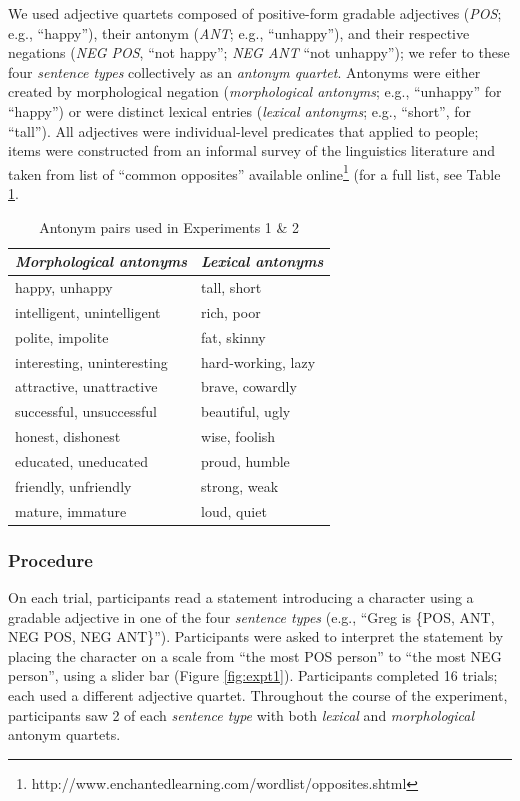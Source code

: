 \documentclass[10pt,letterpaper]{article}
\newcommand{\tableref}[1]{Table \ref{#1}}
\newcommand{\figref}[1]{Figure \ref{#1}}
\begin{document}
We used adjective quartets composed of positive-form gradable adjectives (\emph{POS}; e.g., ``happy''), their antonym (\emph{ANT}; e.g., ``unhappy''), and their respective negations (\emph{NEG POS}, ``not happy''; \emph{NEG ANT} ``not unhappy''); we refer to these four \emph{sentence types} collectively as an \emph{antonym quartet}.
Antonyms were either created by morphological negation (\emph{morphological antonyms}; e.g., ``unhappy'' for ``happy'') or were distinct lexical entries (\emph{lexical antonyms}; e.g., ``short'', for ``tall'').
All adjectives were individual-level predicates that applied to people; items were constructed from an informal survey of the linguistics literature and taken from list of ``common opposites'' available online\footnote{http://www.enchantedlearning.com/wordlist/opposites.shtml} (for a full list, see \tableref{tab:items}.

\begin{table}[b]
\centering
\begin{tabular}{l|l}
\emph{Morphological antonyms}     & \emph{Lexical antonyms}    \\ 
\hline
happy, unhappy             & tall, short         \\
intelligent, unintelligent & rich, poor          \\
polite, impolite           & fat, skinny         \\
interesting, uninteresting & hard-working, lazy  \\
attractive, unattractive   & brave, cowardly     \\
successful, unsuccessful   & beautiful, ugly     \\
honest, dishonest          & wise, foolish       \\
educated, uneducated       & proud, humble       \\
friendly, unfriendly       & strong, weak        \\
mature, immature           & loud, quiet        
\end{tabular}
\caption{Antonym pairs used in Experiments 1 \& 2}
\label{tab:items}
\end{table}


\subsubsection{Procedure}

On each trial, participants read a statement introducing a character using a gradable adjective in one of the four \emph{sentence types} (e.g., ``Greg is \{POS, ANT, NEG POS, NEG ANT\}'').
Participants were asked to interpret the statement by placing the character on a scale from ``the most POS person'' to ``the most NEG person'', using a slider bar (\figref{fig:expt1}).
Participants completed 16 trials; each used a different adjective quartet.
Throughout the course of the experiment, participants saw 2 of each \emph{sentence type} with both \emph{lexical} and \emph{morphological} antonym quartets. 
\end{document}
